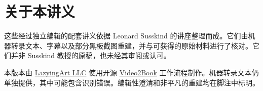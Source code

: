 \documentclass[11pt,oneside]{book}
\begin{document}
\frontmatter
\hypersetup{pageanchor=false}

\hypersetup{pageanchor=true}

\clearpage
\chapter*{关于本讲义}
这些经过独立编辑的配套讲义依据 Leonard Susskind 的讲座整理而成。它们由机器转录文本、字幕以及部分黑板截图重建，并与可获得的原始材料进行了核对。它们并非 Susskind 教授的原稿，也未经其审阅或认可。

本版本由 \href{https://lazying.art}{LazyingArt LLC} 使用开源 \href{https://github.com/lachlanchen/Video2Book}{Video2Book} 工作流程制作。机器转录文本仍单独提供，其中可能包含识别错误。编辑性澄清和非平凡的重建均在脚注中标明。
\clearpage
\tableofcontents
\mainmatter








\end{document}
